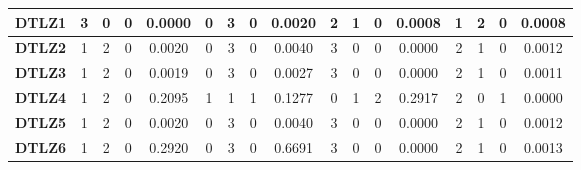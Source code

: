 \begin{table*}[t]
\begin{tabular}{c|c|c|c|c|c|c|c|c|c|c|c|c|c|c|c|c|}
\multicolumn{1}{|c|}{\textbf{DTLZ1}} & 3                   & 0                     & 0                          & 0.0000          & 0                   & 3                     & 0                          & 0.0020          & 2                   & 1                     & 0                          & 0.0008          & 1                   & 2                     & 0                          & 0.0008          \\ \hline
\multicolumn{1}{|c|}{\textbf{DTLZ2}} & 1                   & 2                     & 0                          & 0.0020          & 0                   & 3                     & 0                          & 0.0040          & 3                   & 0                     & 0                          & 0.0000          & 2                   & 1                     & 0                          & 0.0012          \\ \hline
\multicolumn{1}{|c|}{\textbf{DTLZ3}} & 1                   & 2                     & 0                          & 0.0019          & 0                   & 3                     & 0                          & 0.0027          & 3                   & 0                     & 0                          & 0.0000          & 2                   & 1                     & 0                          & 0.0011          \\ \hline
\multicolumn{1}{|c|}{\textbf{DTLZ4}} & 1                   & 2                     & 0                          & 0.2095          & 1                   & 1                     & 1                          & 0.1277          & 0                   & 1                     & 2                          & 0.2917          & 2                   & 0                     & 1                          & 0.0000          \\ \hline
\multicolumn{1}{|c|}{\textbf{DTLZ5}} & 1                   & 2                     & 0                          & 0.0020          & 0                   & 3                     & 0                          & 0.0040          & 3                   & 0                     & 0                          & 0.0000          & 2                   & 1                     & 0                          & 0.0012          \\ \hline
\multicolumn{1}{|c|}{\textbf{DTLZ6}} & 1                   & 2                     & 0                          & 0.2920          & 0                   & 3                     & 0                          & 0.6691          & 3                   & 0                     & 0                          & 0.0000          & 2                   & 1                     & 0                          & 0.0013          \\ \hline

\end{tabular}
\end{table*}
